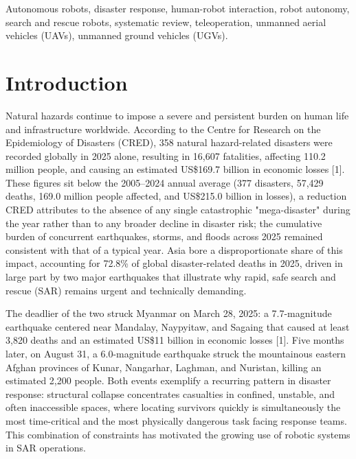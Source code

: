 \documentclass[journal]{IEEEtran}
\begin{document}
\begin{IEEEkeywords}
Autonomous robots, disaster response, human-robot interaction, robot autonomy, search and rescue robots, systematic review, teleoperation, unmanned aerial vehicles (UAVs), unmanned ground vehicles (UGVs).
\end{IEEEkeywords}

\section{Introduction}
\label{sec:introduction}
Natural hazards continue to impose a severe and persistent burden on human life and infrastructure worldwide. According to the Centre for Research on the Epidemiology of Disasters (CRED), 358 natural hazard-related disasters were recorded globally in 2025 alone, resulting in 16,607 fatalities, affecting 110.2 million people, and causing an estimated US\$169.7 billion in economic losses [1]. These figures sit below the 2005--2024 annual average (377 disasters, 57,429 deaths, 169.0 million people affected, and US\$215.0 billion in losses), a reduction CRED attributes to the absence of any single catastrophic "mega-disaster" during the year rather than to any broader decline in disaster risk; the cumulative burden of concurrent earthquakes, storms, and floods across 2025 remained consistent with that of a typical year. Asia bore a disproportionate share of this impact, accounting for 72.8\% of global disaster-related deaths in 2025, driven in large part by two major earthquakes that illustrate why rapid, safe search and rescue (SAR) remains urgent and technically demanding.

The deadlier of the two struck Myanmar on March 28, 2025: a 7.7-magnitude earthquake centered near Mandalay, Naypyitaw, and Sagaing that caused at least 3,820 deaths and an estimated US\$11 billion in economic losses [1]. Five months later, on August 31, a 6.0-magnitude earthquake struck the mountainous eastern Afghan provinces of Kunar, Nangarhar, Laghman, and Nuristan, killing an estimated 2,200 people. Both events exemplify a recurring pattern in disaster response: structural collapse concentrates casualties in confined, unstable, and often inaccessible spaces, where locating survivors quickly is simultaneously the most time-critical and the most physically dangerous task facing response teams. This combination of constraints has motivated the growing use of robotic systems in SAR operations.
\end{document}
